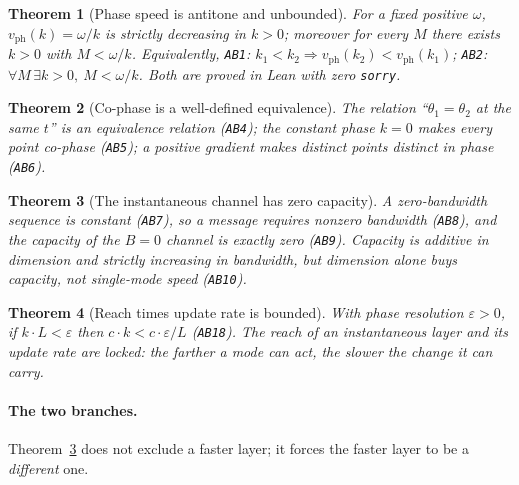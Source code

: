 \documentclass[aps,prd,preprint,superscriptaddress,amsmath,amssymb]{revtex4-2}
\newtheorem{theorem}{Theorem}[section]
\begin{document}
\begin{theorem}[Phase speed is antitone and unbounded]
\label{thm:ab1}
For a fixed positive $\omega$, $v_{\mathrm{ph}}(k)=\omega/k$ is
strictly decreasing in $k>0$; moreover for every $M$ there exists
$k>0$ with $M<\omega/k$.  Equivalently, \texttt{AB1}: $k_1<k_2
\Rightarrow v_{\mathrm{ph}}(k_2)<v_{\mathrm{ph}}(k_1)$; \texttt{AB2}:
$\forall M\,\exists k>0,\ M<\omega/k$.  Both are proved in Lean with
zero \texttt{sorry}.
\end{theorem}

\begin{theorem}[Co-phase is a well-defined equivalence]
\label{thm:ab4}
The relation ``$\theta_1=\theta_2$ at the same $t$'' is an equivalence
relation (\texttt{AB4}); the constant phase $k=0$ makes every point
co-phase (\texttt{AB5}); a positive gradient makes distinct points
distinct in phase (\texttt{AB6}).
\end{theorem}

\begin{theorem}[The instantaneous channel has zero capacity]
\label{thm:ab9}
A zero-bandwidth sequence is constant (\texttt{AB7}), so a message
requires nonzero bandwidth (\texttt{AB8}), and the capacity of the
$B=0$ channel is exactly zero (\texttt{AB9}).  Capacity is additive in
dimension and strictly increasing in bandwidth, but dimension alone
buys capacity, not single-mode speed (\texttt{AB10}).
\end{theorem}

\begin{theorem}[Reach times update rate is bounded]
\label{thm:ab18}
With phase resolution $\varepsilon>0$, if $k\cdot L<\varepsilon$ then
$c\cdot k<c\cdot\varepsilon/L$ (\texttt{AB18}).  The reach of an
instantaneous layer and its update rate are locked: \emph{the farther
a mode can act, the slower the change it can carry.}
\end{theorem}

\paragraph{The two branches.}
Theorem~\ref{thm:ab9} does not exclude a faster layer; it forces the
faster layer to be a \emph{different} one.
\end{document}
